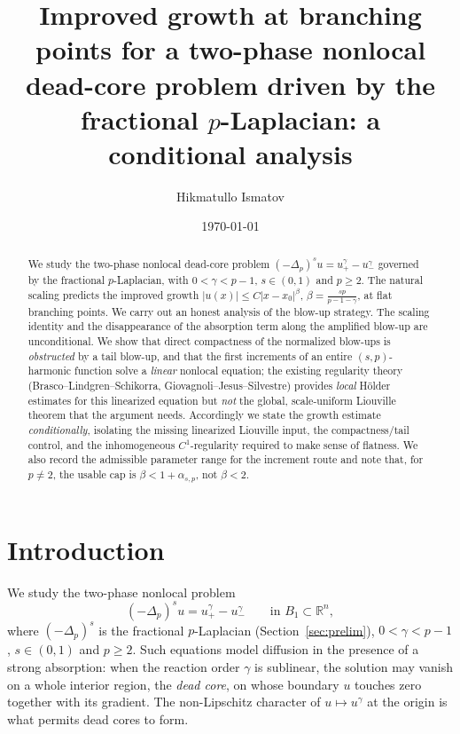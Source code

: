 \documentclass[11pt]{amsart}
\title[A nonlocal two-phase $p$-dead-core problem]{Improved growth at branching
points for a two-phase nonlocal dead-core problem driven by the fractional
$p$-Laplacian: a conditional analysis}
\author{Hikmatullo Ismatov}
\date{\today}
\theoremstyle{plain}
\theoremstyle{definition}
\theoremstyle{remark}
\newcommand{\R}{\mathbb{R}}
\newcommand{\fpl}[1]{(-\Delta_p)^{s}#1}
\newcommand{\asp}{\alpha_{s,p}}
\begin{document}
\begin{abstract}
We study the two-phase nonlocal dead-core problem
$\fpl{u}=u_+^{\gamma}-u_-^{\gamma}$ governed by the fractional $p$-Laplacian,
with $0<\gamma<p-1$, $s\in(0,1)$ and $p\ge2$. The natural scaling predicts the
improved growth $|u(x)|\le C|x-x_0|^{\beta}$, $\beta=\frac{sp}{p-1-\gamma}$, at
flat branching points. We carry out an honest analysis of the blow-up
strategy. The scaling identity and the disappearance of the absorption term
along the amplified blow-up are unconditional. We show that direct compactness
of the normalized blow-ups is \emph{obstructed} by a tail blow-up, and that the
first increments of an entire $(s,p)$-harmonic function solve a \emph{linear}
nonlocal equation; the existing regularity theory (Brasco--Lindgren--Schikorra,
Giovagnoli--Jesus--Silvestre) provides \emph{local} H\"older estimates for this
linearized equation but \emph{not} the global, scale-uniform Liouville theorem
that the argument needs. Accordingly we state the growth estimate
\emph{conditionally}, isolating the missing linearized Liouville input, the
compactness/tail control, and the inhomogeneous $C^{1}$-regularity required to
make sense of flatness. We also record the admissible parameter range for the
increment route and note that, for $p\neq2$, the usable cap is
$\beta<1+\asp$, not $\beta<2$.
\end{abstract}
\maketitle

\section{Introduction}\label{sec:intro}
We study the two-phase nonlocal problem
\begin{equation}\label{eq:main}
  \fpl{u}=u_+^{\gamma}-u_-^{\gamma}\qquad\text{in }B_1\subset\R^n,
\end{equation}
where $\fpl{}$ is the fractional $p$-Laplacian (Section~\ref{sec:prelim}),
$0<\gamma<p-1$, $s\in(0,1)$ and $p\ge2$. Such equations model diffusion in
the presence of a strong absorption: when the reaction order $\gamma$ is
sublinear, the solution may vanish on a whole interior region, the
\emph{dead core}, on whose boundary $u$ touches zero together with its
gradient. The non-Lipschitz character of $u\mapsto u^{\gamma}$ at the origin
is what permits dead cores to form.
\end{document}
